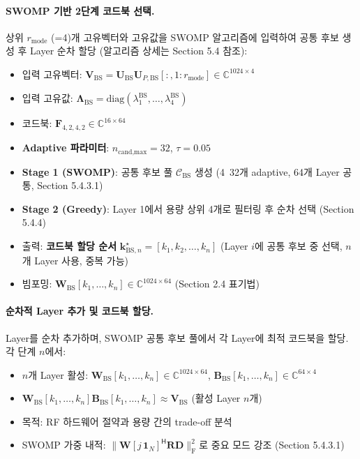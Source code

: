 \documentclass[10pt]{article}
\begin{document}
\paragraph{SWOMP 기반 2단계 코드북 선택.}
상위 $r_{\text{mode}}$ (=4)개 고유벡터와 고유값을 SWOMP 알고리즘에 입력하여 공통 후보 생성 후 Layer 순차 할당 (알고리즘 상세는 Section 5.4 참조):
\begin{itemize}
    \item 입력 고유벡터: $\mathbf{V}_{\text{BS}} = \mathbf{U}_{\text{BS}} \mathbf{U}_{P,\text{BS}}[:, 1:r_{\text{mode}}] \in \mathbb{C}^{1024 \times 4}$
    \item 입력 고유값: $\boldsymbol{\Lambda}_{\text{BS}} = \text{diag}(\lambda_1^{\text{BS}}, \ldots, \lambda_4^{\text{BS}})$
    \item 코드북: $\mathbf{F}_{4,2,4,2} \in \mathbb{C}^{16 \times 64}$
    \item \textbf{Adaptive 파라미터}: $n_{\text{cand,max}} = 32$, $\tau = 0.05$
    \item \textbf{Stage 1 (SWOMP)}: 공통 후보 풀 $\mathcal{C}_{\text{BS}}$ 생성 (4~32개 adaptive, 64개 Layer 공통, Section 5.4.3.1)
    \item \textbf{Stage 2 (Greedy)}: Layer 1에서 용량 상위 4개로 필터링 후 순차 선택 (Section 5.4.4)
    \item 출력: \textbf{코드북 할당 순서} $\boldsymbol{k}_{\text{BS},n}^{\star} = [k_1, k_2, \ldots, k_n]$ (Layer $i$에 공통 후보 중 선택, $n$개 Layer 사용, 중복 가능)
    \item 빔포밍: $\mathbf{W}_{\text{BS}}[k_1, \ldots, k_n] \in \mathbb{C}^{1024 \times 64}$ (Section 2.4 표기법)
\end{itemize}

\paragraph{순차적 Layer 추가 및 코드북 할당.}
Layer를 순차 추가하며, SWOMP 공통 후보 풀에서 각 Layer에 최적 코드북을 할당. 각 단계 $n$에서:
\begin{itemize}
    \item $n$개 Layer 활성: $\mathbf{W}_{\text{BS}}[k_1, \ldots, k_n] \in \mathbb{C}^{1024 \times 64}$, $\mathbf{B}_{\text{BS}}[k_1, \ldots, k_n] \in \mathbb{C}^{64 \times 4}$
    \item $\mathbf{W}_{\text{BS}}[k_1, \ldots, k_n] \mathbf{B}_{\text{BS}}[k_1, \ldots, k_n] \approx \mathbf{V}_{\text{BS}}$ (활성 Layer $n$개)
    \item 목적: RF 하드웨어 절약과 용량 간의 trade-off 분석
    \item SWOMP 가중 내적: $\|\mathbf{W}[j\,\mathbf{1}_N]^{\mathsf{H}} \mathbf{R} \mathbf{D}\|_{\text{F}}^2$로 중요 모드 강조 (Section 5.4.3.1)
\end{itemize}
\end{document}
